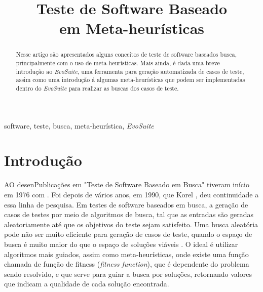 \documentclass[conference]{IEEEtran}
\begin{document}
\title{Teste de Software Baseado  \\ em Meta-heurísticas
}

\author{
\and
{}
\and
{}
}

\maketitle

\begin{abstract}

Nesse artigo são apresentados alguns conceitos de teste de software baseados busca, principalmente com o uso de meta-heurísticas. Mais ainda, é dada uma breve introdução ao \emph{EvoSuite}, uma ferramenta para geração automatizada de casos de teste, assim como uma introdução á algumas meta-heurísticas que podem ser implementadas dentro do \emph{EvoSuite} para realizar as buscas dos casos de teste.
\end{abstract}

\begin{IEEEkeywords}
software, teste, busca, meta-heurística, \emph{EvoSuite}
\end{IEEEkeywords}

\section{Introdução}

AO desenPublicações em "Teste de Software Baseado em Busca" tiveram início em 1976 com \cite{Miller:1976}. Foi depois de vários anos, em 1990, que Korel \cite{Korel:1990}, \cite{Korel:1992} deu continuidade a essa linha de pesquisa. Em testes de software baseados em busca, a geração de casos de testes por meio de algoritmos de busca, tal que as entradas são geradas aleatoriamente até que os objetivos do teste sejam satisfeito. Uma busca aleatória pode não ser muito eficiente para geração de casos de teste, quando o espaço de busca é muito maior do que o espaço de soluções viáveis \cite{McMinn:2011}. O ideal é utilizar algoritmos mais guiados, assim como meta-heurísticas, onde existe uma função chamada de função de fitness (\emph{fitness function}), que é dependente do problema sendo resolvido, e que serve para guiar a busca por soluções, retornando valores que indicam a qualidade de cada solução encontrada. 
\end{document}
